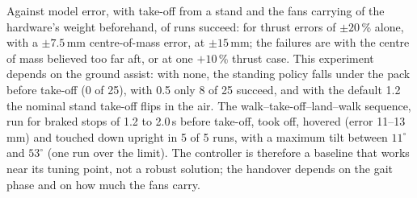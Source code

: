 \documentclass[11pt]{article}
\begin{document}
Against model error, with take-off from a stand and the fans carrying \frRobAssist{} of the hardware's weight
beforehand, \frRobOk{} of \frRobN{} runs succeed: \frRobThrustOk{} for thrust errors of $\pm20$\,\% alone,
\frRobComSmallOk{} with a $\pm7.5$\,mm centre-of-mass error, \frRobComBigOk{} at $\pm15$\,mm; the failures are
with the centre of mass believed too far aft, or at one $+10$\,\% thrust case. This experiment depends on the
ground assist: with none, the standing policy falls under the pack before take-off (0 of 25), with 0.5 only 8 of
25 succeed, and with the default 1.2 the nominal stand take-off flips in the air. The
walk--take-off--land--walk sequence, run for braked stops of 1.2 to 2.0\,s before take-off, took off, hovered
(error 11--13\,mm) and touched down upright in 5 of 5 runs, with a maximum tilt between $11^\circ$ and
$53^\circ$ (one run over the limit). The controller is therefore a baseline that works near its tuning point, not
a robust solution; the handover depends on the gait phase and on how much the fans carry.
\end{document}
